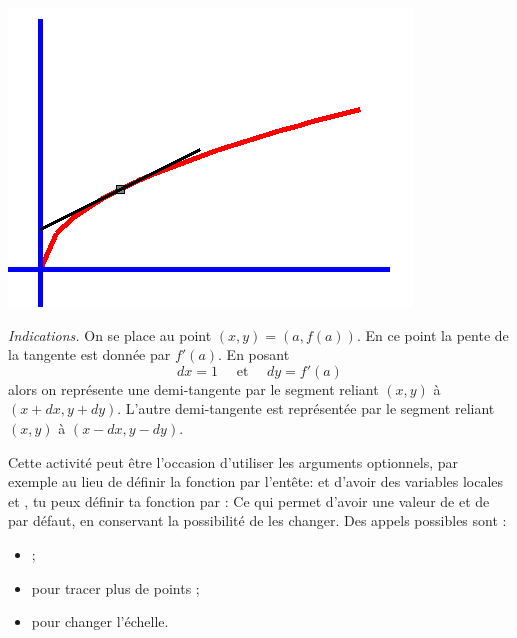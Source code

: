 \documentclass[11pt,class=report,crop=false]{standalone}
\begin{document}
\begin{activite}
\begin{enumerate}
\begin{center}
\includegraphics[scale=0.3]{ecran-graphe-4}
\end{center}  
  
  \emph{Indications.}
  On se place au point $(x,y) = (a,f(a))$. En ce point la pente de la tangente est donnée par $f'(a)$. En posant 
  $$dx = 1 \quad \text{ et } \quad dy = f'(a)$$
  alors on représente une demi-tangente par le segment reliant
  $(x,y)$ à $(x+dx,y+dy)$. L'autre demi-tangente est représentée par le segment reliant 
  $(x,y)$ à $(x-dx,y-dy)$.

  
  
  

  
 
  
  
\end{enumerate} 


Cette activité peut être l'occasion d'utiliser les arguments optionnels,
par exemple au lieu de définir la fonction  par l'entête:
et d'avoir des variables locales  et , tu peux définir ta fonction par :
Ce qui permet d'avoir une valeur de  et de  par défaut, en conservant la possibilité de les changer. Des appels possibles sont :
\begin{itemize}
  \item {} ;
  \item {}  pour tracer plus de points ;
  \item {} pour changer l'échelle.
\end{itemize}
\end{activite}
\end{document}

